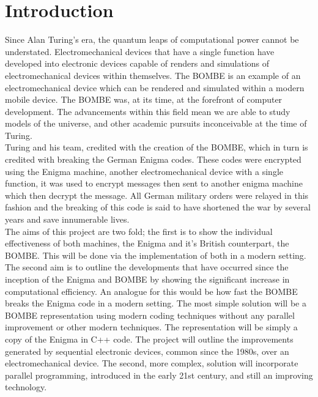 \documentclass[12pt,a4paper]{article}
\begin{document}
\section{Introduction}

Since Alan Turing's era, the quantum leaps of computational power cannot be understated. Electromechanical devices that have a single function have developed into electronic devices capable of renders and simulations of electromechanical devices within themselves. The BOMBE is an example of an electromechanical device which can be rendered and simulated within a modern mobile device. The BOMBE was, at its time, at the forefront of computer development. The advancements within this field mean we are able to study models of the universe, and other academic pursuits inconceivable at the time of Turing.\\

Turing and his team, credited with the creation of the BOMBE, which in turn is credited with breaking the German Enigma codes. These codes were encrypted using the Enigma machine, another electromechanical device with a single function, it was used to encrypt messages then sent to another enigma machine which then decrypt the message.  All German military orders were relayed in this fashion and the breaking of this code is said to have shortened the war by several years and save innumerable lives.\\

The aims of this project are two fold; the first is to show the individual effectiveness of both machines, the Enigma and it's British counterpart, the BOMBE. This will be done via the implementation of both in a modern setting. The second aim is to outline the developments that have occurred since the inception of the Enigma and BOMBE by showing the significant increase in computational efficiency. An analogue for this would be how fast the BOMBE breaks the Enigma code in a modern setting. The most simple solution will be a BOMBE representation using modern coding techniques without any parallel improvement or other modern techniques. The representation will be simply a copy of the Enigma in C++ code. The project will outline the improvements generated by sequential electronic devices, common since the 1980s, over an electromechanical device. The second, more complex, solution will incorporate parallel programming, introduced in the early 21st century, and still an improving technology.\\
\end{document}
